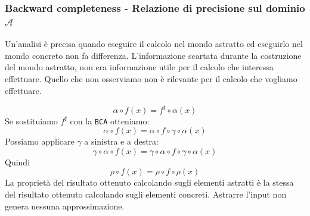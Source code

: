 \subsubsection{Backward completeness - Relazione di precisione sul dominio $\mathcal{A}$}
Un'analisi è precisa quando eseguire il calcolo nel mondo astratto ed eseguirlo nel mondo concreto 
non fa differenza. L'informazione scartata durante la costruzione del mondo astratto, non era informazione utile per il calcolo 
che interessa effettuare. Quello che non osserviamo non è rilevante 
per il calcolo che vogliamo effettuare.
\begin{figure}[H]
    \centering
\end{figure}
\[
    \alpha \circ f(x) = f^\sharp \circ \alpha(x) 
\]
Se sostituiamo $f^\sharp$ con la \texttt{BCA} otteniamo:
\[
    \alpha \circ f(x) = \alpha \circ f \circ \gamma \circ \alpha(x)
\]
Possiamo applicare $\gamma$ a sinistra e a destra:
\[
    \gamma \circ \alpha \circ f(x) = \gamma \circ \alpha \circ f \circ \gamma \circ \alpha(x)
\]
Quindi
\[
    \rho \circ f(x) = \rho \circ f \circ \rho(x)
\]
La proprietà del risultato ottenuto calcolando sugli elementi astratti è la stessa 
del risultato ottenuto calcolando sugli elementi concreti. Astrarre l'input non genera nessuna 
approssimazione.
